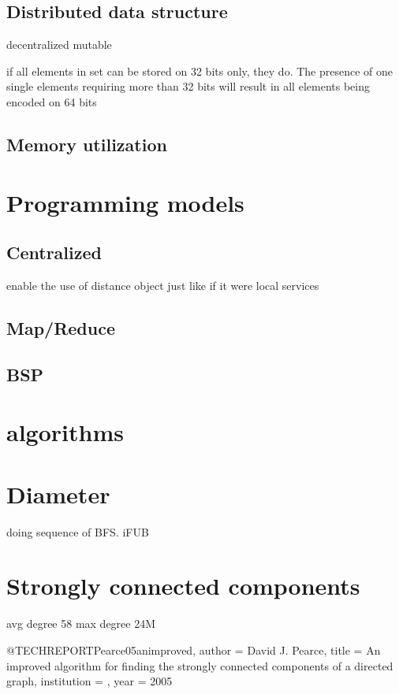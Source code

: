 \documentclass[11pt,a4paper]{article}
\begin{document}
\subsection{Distributed data structure}


	decentralized
	mutable
	
	if all elements in set can be stored on 32 bits only, they do. The presence of one single elements requiring more than 32 bits will result in all elements being encoded on 64 bits
	
\subsection{Memory utilization}

\section{Programming models}
\subsection{Centralized}

enable the use of distance object just like if it were local
services

\subsection{Map/Reduce}



\subsection{BSP}


\section{algorithms}

\section{Diameter}
doing sequence of BFS.
iFUB

\section{Strongly connected components}
avg degree 58
max degree 24M


@TECHREPORT{Pearce05animproved,
    author = {David J. Pearce},
    title = {An improved algorithm for finding the strongly connected components of a directed graph},
    institution = {},
    year = {2005}
}
\end{document}
